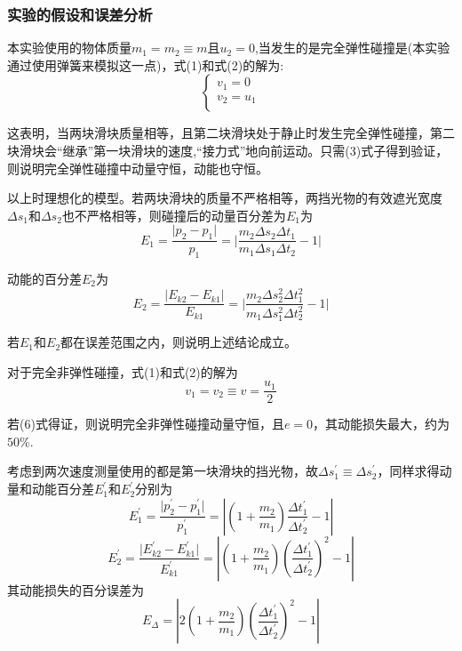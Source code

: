 \documentclass[UTF8]{article}
\begin{document}
	\subsubsection*{实验的假设和误差分析}
	\par 本实验使用的物体质量$m_1=m_2\equiv m$且$u_2=0$,当发生的是完全弹性碰撞是(本实验通过使用弹簧来模拟这一点)，式(1)和式(2)的解为:
	\begin{equation}
		\left\{
		\begin{matrix}
			v_1=0 \\
			v_2=u_1 \\
		\end{matrix}
		\right.
	\end{equation}
	\par 这表明，当两块滑块质量相等，且第二块滑块处于静止时发生完全弹性碰撞，第二块滑块会“继承”第一块滑块的速度,“接力式”地向前运动。只需(3)式子得到验证，则说明完全弹性碰撞中动量守恒，动能也守恒。
	\par 以上时理想化的模型。若两块滑块的质量不严格相等，两挡光物的有效遮光宽度$\Delta s_1$和$\Delta s_2$也不严格相等，则碰撞后的动量百分差为$E_1$为
	\begin{equation}
		E_1=\frac{\vert p_2-p_1 \vert}{p_1}=\vert \frac{m_2\Delta s_2\Delta t_1}{m_1\Delta s_1\Delta t_2}-1 \vert
	\end{equation}
	\par 动能的百分差$E_2$为
	\begin{equation}
		E_2=\frac{\vert E_{k2}-E_{k1} \vert}{E_{k1}}=\vert \frac{m_2\Delta s_2^2\Delta t_1^2}{m_1\Delta s_1^2\Delta t_2^2}-1 \vert
	\end{equation}
	\par 若$E_1$和$E_2$都在误差范围之内，则说明上述结论成立。
	\vspace*{1cm}
	\par 对于完全非弹性碰撞，式(1)和式(2)的解为
	\begin{equation}
		v_1=v_2\equiv v=\frac{u_1}{2}
	\end{equation}
	\par 若(6)式得证，则说明完全非弹性碰撞动量守恒，且$e=0$，其动能损失最大，约为$50\%$.
	\par 考虑到两次速度测量使用的都是第一块滑块的挡光物，故$\Delta s_1^{'} \equiv \Delta s_2^{'}$，同样求得动量和动能百分差$E_1^{'}$和$E_2^{'}$分别为
	\begin{equation}
		E_1^{'}=\frac{\vert p_2^{'}-p_1^{'} \vert}{p_1^{'}} =\left\vert \left(1+\frac{m_2}{m_1}\right)\frac{\Delta t_1^{'}}{\Delta t_2^{'}}-1 \right\vert
	\end{equation}
	\begin{equation}
			E_2^{'}=\frac{\vert E_{k2}^{'}-E_{k1}^{'} \vert}{E_{k1}^{'}}=\left\vert \left(1+\frac{m_2}{m_1}\right)\left(\frac{\Delta t_1^{'}}{\Delta t_2^{'}}\right)^2-1 \right\vert
	\end{equation}
	 其动能损失的百分误差为
	 \begin{equation}
	 	E_{\Delta} = \left\vert 2\left(1+\frac{m_2}{m_1}\right)\left(\frac{\Delta t_1^{'}}{\Delta t_2^{'}}\right)^2-1 \right\vert
	 \end{equation}
\end{document}
